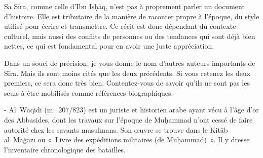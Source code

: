 Sa Sīra, comme celle d'Ibn Isḥāq, n'est pas à proprement parler un
document d'histoire. Elle est tributaire de la manière de raconter
propre à l'époque, du style utilisé pour écrire et transmettre. Ce récit
est donc dépendant du contexte culturel, mais aussi des conflits de
personnes ou des tendances qui sont déjà bien nettes, ce qui est
fondamental pour en avoir une juste appréciation.


Dans un souci de précision, je vous donne le nom d'autres auteurs
importants de Sīra. Mais ils sont moins cités que les deux précédents.
Si vous retenez les deux premiers, ce sera donc très bien.
Contentez-vous de savoir qu'ils ne sont pas les seuls à être mobilisés
comme références biographiques.

- Al~Wāqidī (m.~207/823) est un juriste et historien arabe ayant vécu à
l'âge d'or des Abbasides, dont les travaux sur l'époque de Muḥammad
n'ont cessé de faire autorité chez les savants musulmans. Son œuvre se
trouve dans le Kitāb al~Maġāzī ou «~Livre des expéditions militaires (de
Muḥammad)~». Il y dresse
l'inventaire chronologique des batailles.

